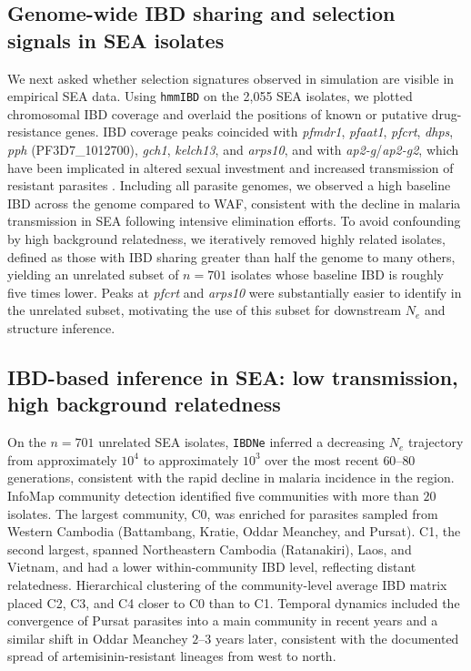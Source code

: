 \documentclass[11pt]{article}
\begin{document}
\subsection{Genome-wide IBD sharing and selection signals in SEA isolates}

We next asked whether selection signatures observed in simulation are visible in empirical SEA data. Using \texttt{hmmIBD} on the 2,055 SEA isolates, we plotted chromosomal IBD coverage and overlaid the positions of known or putative drug-resistance genes. IBD coverage peaks coincided with \textit{pfmdr1}, \textit{pfaat1}, \textit{pfcrt}, \textit{dhps}, \textit{pph} (PF3D7\_1012700), \textit{gch1}, \textit{kelch13}, and \textit{arps10}, and with \textit{ap2-g}/\textit{ap2-g2}, which have been implicated in altered sexual investment and increased transmission of resistant parasites \citep{ariey2014kelch13,fidock2000pfcrt,miotto2015genetic}. Including all parasite genomes, we observed a high baseline IBD across the genome compared to WAF, consistent with the decline in malaria transmission in SEA following intensive elimination efforts. To avoid confounding by high background relatedness, we iteratively removed highly related isolates, defined as those with IBD sharing greater than half the genome to many others, yielding an unrelated subset of $n = 701$ isolates whose baseline IBD is roughly five times lower. Peaks at \textit{pfcrt} and \textit{arps10} were substantially easier to identify in the unrelated subset, motivating the use of this subset for downstream $N_e$ and structure inference.

\subsection{IBD-based inference in SEA: low transmission, high background relatedness}

On the $n = 701$ unrelated SEA isolates, \texttt{IBDNe} inferred a decreasing $N_e$ trajectory from approximately $10^4$ to approximately $10^3$ over the most recent $60$--$80$ generations, consistent with the rapid decline in malaria incidence in the region. InfoMap community detection identified five communities with more than $20$ isolates. The largest community, C0, was enriched for parasites sampled from Western Cambodia (Battambang, Kratie, Oddar Meanchey, and Pursat). C1, the second largest, spanned Northeastern Cambodia (Ratanakiri), Laos, and Vietnam, and had a lower within-community IBD level, reflecting distant relatedness. Hierarchical clustering of the community-level average IBD matrix placed C2, C3, and C4 closer to C0 than to C1. Temporal dynamics included the convergence of Pursat parasites into a main community in recent years and a similar shift in Oddar Meanchey $2$--$3$ years later, consistent with the documented spread of artemisinin-resistant lineages from west to north.
\end{document}
